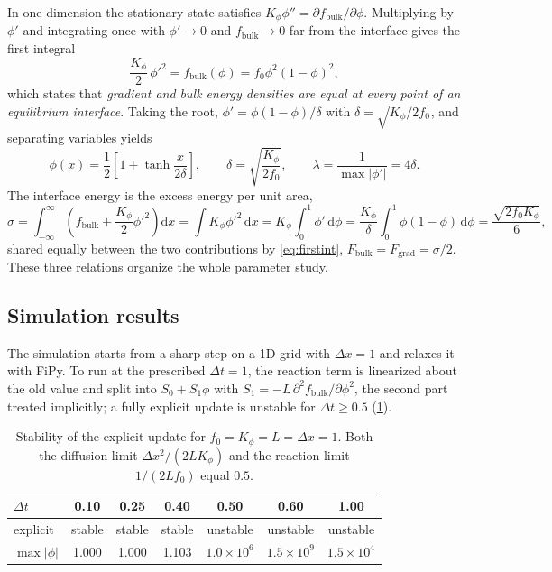 \documentclass[11pt,a4paper]{article}
\numberwithin{equation}{section}
\theoremstyle{remark}
\newcommand{\fb}{f_{\mathrm{bulk}}}
\begin{document}
In one dimension the stationary state satisfies $K_\phi\phi'' = \partial\fb/\partial\phi$. Multiplying
by $\phi'$ and integrating once with $\phi' \to 0$ and $\fb \to 0$ far from the interface gives the
first integral
\begin{equation}\label{eq:firstint}
  \frac{K_\phi}{2}\,\phi'^2 = \fb(\phi) = f_0\phi^2(1-\phi)^2,
\end{equation}
which states that \emph{gradient and bulk energy densities are equal at every point of an equilibrium
interface}. Taking the root, $\phi' = \phi(1-\phi)/\delta$ with $\delta = \sqrt{K_\phi/2f_0}$, and
separating variables yields
\begin{equation}\label{eq:tanh}
  \phi(x) = \frac{1}{2}\left[1 + \tanh\frac{x}{2\delta}\right],
  \qquad
  \delta = \sqrt{\frac{K_\phi}{2f_0}},
  \qquad
  \lambda = \frac{1}{\max|\phi'|} = 4\delta .
\end{equation}
The interface energy is the excess energy per unit area,
\begin{equation}\label{eq:sigma}
  \sigma = \int_{-\infty}^{\infty}\left(\fb + \frac{K_\phi}{2}\phi'^2\right)\mathrm{d}x
  = \int K_\phi\phi'^2\,\mathrm{d}x = K_\phi\int_0^1\phi'\,\mathrm{d}\phi
  = \frac{K_\phi}{\delta}\int_0^1\phi(1-\phi)\,\mathrm{d}\phi
  = \frac{\sqrt{2f_0K_\phi}}{6},
\end{equation}
shared equally between the two contributions by \cref{eq:firstint}, $F_{\mathrm{bulk}} =
F_{\mathrm{grad}} = \sigma/2$. These three relations organize the whole parameter study.

\subsection{Simulation results}\label{sec:task1results}

The simulation starts from a sharp step on a 1D grid with $\Delta x = 1$ and relaxes it with FiPy. To run at the prescribed
$\Delta t = 1$, the reaction term is linearized about the old value and split into
$S_0 + S_1\phi$ with $S_1 = -L\,\partial^2\fb/\partial\phi^2$, the second part treated implicitly; a
fully explicit update is unstable for $\Delta t \ge 0.5$ (\cref{tab:explicit}).

\begin{table}[ht]
  \centering
  \caption{Stability of the explicit update for $f_0 = K_\phi = L = \Delta x = 1$. Both
    the diffusion limit $\Delta x^2/(2LK_\phi)$ and the reaction limit $1/(2Lf_0)$ equal $0.5$.}
  \label{tab:explicit}
  \begin{tabular}{lcccccc}
    \toprule
    $\Delta t$ & 0.10 & 0.25 & 0.40 & 0.50 & 0.60 & 1.00 \\
    \midrule
    explicit & stable & stable & stable & unstable & unstable & unstable \\
    $\max|\phi|$ & 1.000 & 1.000 & 1.103 & $1.0\times10^{6}$ & $1.5\times10^{9}$ & $1.5\times10^{4}$ \\
    \bottomrule
  \end{tabular}
\end{table}
\end{document}

